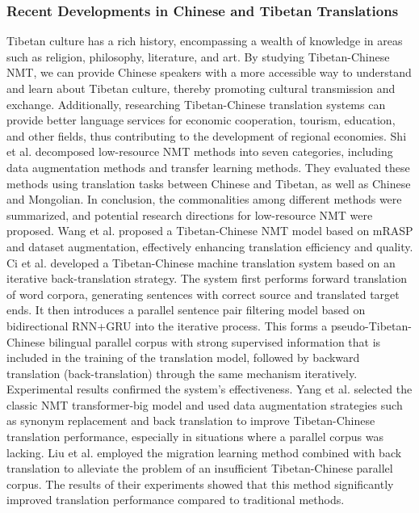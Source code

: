 \documentclass[acmsmall]{acmart}
\begin{document}
\subsubsection{Recent Developments in Chinese and Tibetan Translations}

Tibetan culture has a rich history, encompassing a wealth of knowledge in areas such as religion, philosophy, literature, and art. By studying Tibetan-Chinese NMT, we can provide Chinese speakers with a more accessible way to understand and learn about Tibetan culture, thereby promoting cultural transmission and exchange. Additionally, researching Tibetan-Chinese translation systems can provide better language services for economic cooperation, tourism, education, and other fields, thus contributing to the development of regional economies. 
\color{green}Shi et al. \cite{DBLP:journals/talip/ShiWSH22} decomposed low-resource NMT methods into seven categories, including data augmentation methods and transfer learning methods. They evaluated these methods using translation tasks between Chinese and Tibetan, as well as Chinese and Mongolian. In conclusion, the commonalities among different methods were summarized, and potential research directions for low-resource NMT were proposed. \color{black}
Wang et al. \cite{4-15} proposed a Tibetan-Chinese NMT model based on mRASP and dataset augmentation, effectively enhancing translation efficiency and quality. Ci et al. \cite{4-16} developed a Tibetan-Chinese machine translation system based on an iterative back-translation strategy. The system first performs forward translation of word corpora, generating sentences with correct source and translated target ends. It then introduces a parallel sentence pair filtering model based on bidirectional RNN+GRU into the iterative process. This forms a pseudo-Tibetan-Chinese bilingual parallel corpus with strong supervised information that is included in the training of the translation model, followed by backward translation (back-translation) through the same mechanism iteratively. Experimental results confirmed the system's effectiveness. Yang et al. \cite{4-16b1} selected the classic NMT transformer-big model and used data augmentation strategies such as synonym replacement and back translation to improve Tibetan-Chinese translation performance, especially in situations where a parallel corpus was lacking. Liu et al. \cite{4-16b2} employed the migration learning method combined with back translation to alleviate the problem of an insufficient Tibetan-Chinese parallel corpus. The results of their experiments showed that this method significantly improved translation performance compared to traditional methods.
\end{document}
